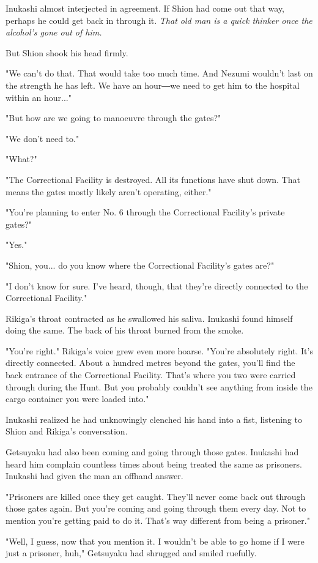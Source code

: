 Inukashi almost interjected in agreement. If Shion had come out that
way, perhaps he could get back in through it. \emph{That old man is a quick
thinker once the alcohol's gone out of him.}

But Shion shook his head firmly.

"We can't do that. That would take too much time. And Nezumi wouldn't
last on the strength he has left. We have an hour―we need to get him to
the hospital within an hour..."

"But how are we going to manoeuvre through the gates?"

"We don't need to."

"What?"

"The Correctional Facility is destroyed. All its functions have shut
down. That means the gates mostly likely aren't operating, either."

"You're planning to enter No. 6 through the Correctional Facility's
private gates?"

"Yes."

"Shion, you... do you know where the Correctional Facility's gates are?"

"I don't know for sure. I've heard, though, that they're directly
connected to the Correctional Facility."

Rikiga's throat contracted as he swallowed his saliva. Inukashi found
himself doing the same. The back of his throat burned from the smoke.

"You're right." Rikiga's voice grew even more hoarse. "You're absolutely
right. It's directly connected. About a hundred metres beyond the gates,
you'll find the back entrance of the Correctional Facility. That's where
you two were carried through during the Hunt. But you probably couldn't
see anything from inside the cargo container you were loaded into."

Inukashi realized he had unknowingly clenched his hand into a fist,
listening to Shion and Rikiga's conversation.

Getsuyaku had also been coming and going through those gates. Inukashi
had heard him complain countless times about being treated the same as
prisoners. Inukashi had given the man an offhand answer.

"Prisoners are killed once they get caught. They'll never come back out
through those gates again. But you're coming and going through them
every day. Not to mention you're getting paid to do it. That's way
different from being a prisoner."

"Well, I guess, now that you mention it. I wouldn't be able to go home
if I were just a prisoner, huh," Getsuyaku had shrugged and smiled
ruefully.

